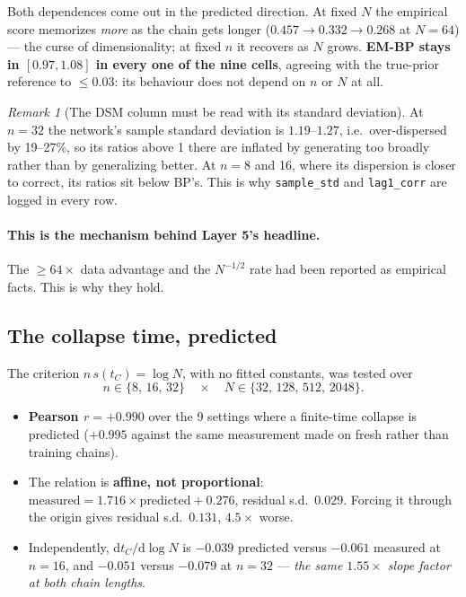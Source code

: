 \documentclass[11pt]{article}
\theoremstyle{remark}
\newtheorem{remark}{Remark}
\newcommand{\code}[1]{\texttt{\small #1}}
\begin{document}
Both dependences come out in the predicted direction. At fixed $N$ the empirical
score memorizes \emph{more} as the chain gets longer ($0.457 \to 0.332 \to
0.268$ at $N=64$) --- the curse of dimensionality; at fixed $n$ it recovers as
$N$ grows. \textbf{EM-BP stays in $[0.97, 1.08]$ in every one of the nine
cells}, agreeing with the true-prior reference to $\leq 0.03$: its behaviour
does not depend on $n$ or $N$ at all.

\begin{remark}[The DSM column must be read with its standard deviation]
At $n=32$ the network's sample standard deviation is $1.19$--$1.27$, i.e.\
over-dispersed by 19--27\%, so its ratios above 1 there are inflated by
generating too broadly rather than by generalizing better. At $n=8$ and 16,
where its dispersion is closer to correct, its ratios sit below BP's. This is
why \code{sample\_std} and \code{lag1\_corr} are logged in every row.
\end{remark}

\paragraph{This is the mechanism behind Layer 5's headline.} The
$\geq 64\times$ data advantage and the $N^{-1/2}$ rate had been reported as
empirical facts. This is why they hold.

\subsection{The collapse time, predicted}

The criterion $n\,s(t_C) = \log N$, with no fitted constants, was tested over
\[
  n \in \{8,\,16,\,32\}
  \quad\times\quad
  N \in \{32,\,128,\,512,\,2048\}.
\]
\begin{itemize}[nosep]
  \item \textbf{Pearson $r = +0.990$} over the 9 settings where a finite-time
    collapse is predicted ($+0.995$ against the same measurement made on fresh
    rather than training chains).
  \item The relation is \textbf{affine, not proportional}:
    $\text{measured} = 1.716\times\text{predicted} + 0.276$, residual
    s.d.\ $0.029$. Forcing it through the origin gives residual s.d.\ $0.131$,
    $4.5\times$ worse.
  \item Independently, $\mathrm{d}t_C/\mathrm{d}\log N$ is $-0.039$ predicted
    versus $-0.061$ measured at $n=16$, and $-0.051$ versus $-0.079$ at $n=32$
    --- \emph{the same $1.55\times$ slope factor at both chain lengths}.
\end{itemize}
\end{document}
